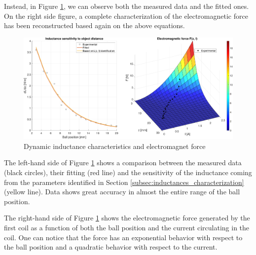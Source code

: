Instead, in Figure \ref{fig:dynamic_inductance_characteristics}, we can observe both the measured data and the fitted ones.
On the right side figure, a complete characterization of the electromagnetic force has been reconstructed based again on the above equations.

\begin{figure}[H]
    \centering
    \includegraphics[width=1\textwidth]{img/MATLAB/identification/force.pdf}
    \caption{Dynamic inductance characteristics and electromagnet force}
    \label{fig:dynamic_inductance_characteristics}
\end{figure}

The left-hand side of Figure \ref{fig:dynamic_inductance_characteristics} shows a comparison between the measured data (black circles), their fitting (red line) and the sensitivity of the inductance coming from the parameters identified in Section \ref{subsec:inductances_characterization} (yellow line).
Data shows great accuracy in almost the entire range of the ball position.

The right-hand side of Figure \ref{fig:dynamic_inductance_characteristics} shows the electromagnetic force generated by the first coil as a function of both the ball position and the current circulating in the coil.
One can notice that the force has an exponential behavior with respect to the ball position and a quadratic behavior with respect to the current.